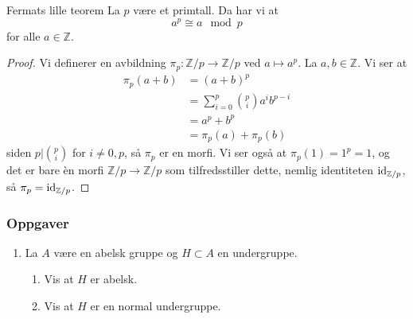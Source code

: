 \begin{corollary}{Fermats lille teorem}
    La $p$ være et primtall.
    Da har vi at
    \[
        a^p \cong a \mod p
    \]
    for alle $a\in \mathbb Z$.
\end{corollary}
\begin{proof}
    Vi definerer en avbildning $\pi_p\colon \mathbb Z / p\to\mathbb Z / p$
    ved $a\mapsto a^p$.
    La $a,b\in \mathbb Z$.
    Vi ser at
    \[\begin{aligned}
        \pi_p(a + b)
        &= (a + b)^p
        \\
        &= \sum_{i = 0}^p \binom p i a^i b^{p - i}
        \\
        &= a^p + b^p
        \\
        &= \pi_p(a) + \pi_p(b)
    \end{aligned}\]
    siden $p|\binom p i$ for $i\neq 0, p$,
    så $\pi_p$ er en morfi.
    Vi ser også at $\pi_p(1) = 1^p = 1$,
    og det er bare \`en morfi $\mathbb Z / p\to \mathbb Z / p$
    som tilfredsstiller dette, nemlig identiteten $\operatorname{id}_{\mathbb Z / p}$,
    så $\pi_p = \operatorname{id}_{\mathbb Z / p}$.
\end{proof}

\subsubsection*{Oppgaver}
\begin{enumerate}
    \item La $A$ være en abelsk gruppe og $H\subset A$ en undergruppe.
        \begin{enumerate}
            \item Vis at $H$ er abelsk.
            \item Vis at $H$ er en normal undergruppe.
        \end{enumerate}
\end{enumerate}
